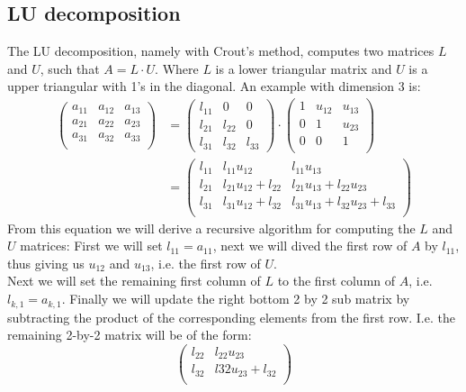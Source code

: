 \subsection*{LU decomposition}
The LU decomposition, namely with Crout's method, computes two matrices $L$ and $U$, such that $A=L \cdot U$. Where $L$ is a lower triangular matrix and $U$ is a upper triangular with 1's in the diagonal. An example with dimension 3 is:
\begin{align*}
	 \begin{pmatrix}
	 a_{11} & a_{12} & a_{13}\\
	 a_{21} & a_{22} & a_{23}\\
	 a_{31} & a_{32} & a_{33}\\
	 \end{pmatrix} & = \begin{pmatrix} l_{11}  & 0 & 0\\
	 l_{21} & l_{22} & 0\\
	 l_{31} & l_{32} & l_{33}
	 \end{pmatrix} \cdot \begin{pmatrix} 1 & u_{12} & u_{13}\\
	 0 & 1 & u_{23}\\
	 0 & 0 & 1\\
	 \end{pmatrix}\\
	& = \begin{pmatrix} l_{11} & l_{11} u_{12} & l_{11} u_{13}\\
	l_{21} & l_{21} u_{12} + l_{22} & l_{21} u_{13} + l_{22} u_{23}\\
	l_{31} & l_{31} u_{12} + l_{32} & l_{31} u_{13} + l_{32} u_{23} + l_{33}\\
	\end{pmatrix}
\end{align*} 
From this equation we will derive a recursive algorithm for computing the $L$ and $U$ matrices:
First we will set $l_{11} = a_{11}$, next we will dived the first row of $A$ by $l_{11}$, thus giving us $u_{12}$ and $u_{13}$, i.e. the first row of $U$.\\
Next we will set the remaining first column of $L$ to the first column of $A$, i.e. $l_{k,1} = a_{k,1}$. Finally we will update the right bottom 2 by 2 sub matrix by subtracting the product of the corresponding elements from the first row. I.e. the remaining 2-by-2 matrix will be of the form: 
\begin{equation*}
 \begin{pmatrix}
l_{22} & l_{22} u_{23}\\
l_{32} & l{32} u_{23} + l_{32}\\
\end{pmatrix}
\end{equation*}
